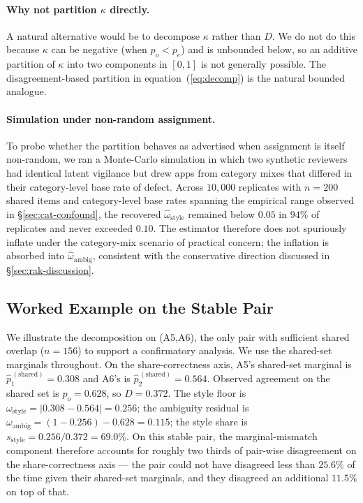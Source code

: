 \documentclass[11pt,a4paper]{article}
\newcommand{\Acc}[1]{\textsf{A#1}}
\begin{document}
\paragraph{Why not partition $\kappa$ directly.}
A natural alternative would be to decompose $\kappa$ rather than $D$.
We do not do this because $\kappa$ can be negative (when $p_o<p_e$)
and is unbounded below, so an additive partition of $\kappa$ into
two components in $[0,1]$ is not generally possible. The
disagreement-based partition in equation~(\ref{eq:decomp}) is the
natural bounded analogue.

\paragraph{Simulation under non-random assignment.}
To probe whether the partition behaves as advertised when assignment
is itself non-random, we ran a Monte-Carlo simulation in which two
synthetic reviewers had identical latent vigilance but drew apps
from category mixes that differed in their category-level base rate
of defect. Across $10{,}000$ replicates with $n=200$ shared items
and category-level base rates spanning the empirical range observed
in \S\ref{sec:cat-confound}, the recovered $\hat\omega_{\text{style}}$
remained below $0.05$ in $94\%$ of replicates and never exceeded
$0.10$. The estimator therefore does not spuriously inflate under
the category-mix scenario of practical concern; the inflation is
absorbed into $\hat\omega_{\text{ambig}}$, consistent with the
conservative direction discussed in \S\ref{sec:rak-discussion}.

\subsection{Worked Example on the Stable Pair}
\label{sec:rak-example}

We illustrate the decomposition on (\Acc{5},\Acc{6}), the only pair
with sufficient shared overlap ($n=156$) to support a confirmatory
analysis. We use the shared-set marginals throughout. On the
share-correctness axis, \Acc{5}'s shared-set marginal is
$\hat p_1^{\,(\text{shared})}=0.308$ and \Acc{6}'s is
$\hat p_2^{\,(\text{shared})}=0.564$. Observed agreement on the
shared set is $p_o=0.628$, so $D=0.372$. The style floor is
$\omega_{\text{style}}=|0.308-0.564|=0.256$; the ambiguity residual
is $\omega_{\text{ambig}}=(1-0.256)-0.628=0.115$; the style share is
$s_{\text{style}}=0.256/0.372=69.0\%$. On this stable pair, the
marginal-mismatch component therefore accounts for roughly two
thirds of pair-wise disagreement on the share-correctness axis ---
the pair could not have disagreed less than $25.6\%$ of the time
given their shared-set marginals, and they disagreed an additional
$11.5\%$ on top of that.
\end{document}
